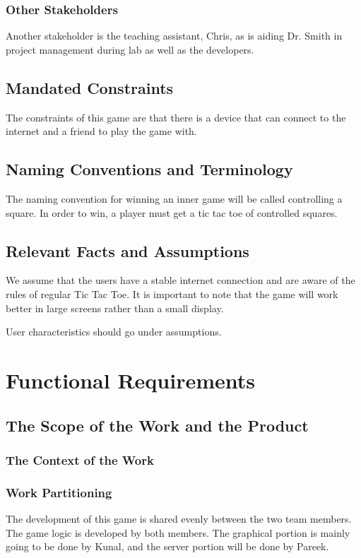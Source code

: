 \documentclass[12pt, titlepage]{article}
\begin{document}
\subsubsection{Other Stakeholders}
Another stakeholder is the teaching assistant, Chris, as is aiding Dr. Smith in project management during lab as well as the developers.
\subsection{Mandated Constraints}
The constraints of this game are that there is a device that can connect to the internet and a friend to play the game with.
\subsection{Naming Conventions and Terminology}
The naming convention for winning an inner game will be called controlling a square. In order to win, a player must get a tic tac toe of controlled squares.
\subsection{Relevant Facts and Assumptions}
We assume that the users have a stable internet connection and are aware of the rules of regular Tic Tac Toe. It is important to note that the game will work better in large screens rather than a small display. 

User characteristics should go under assumptions.

\section{Functional Requirements}

\subsection{The Scope of the Work and the Product}

\subsubsection{The Context of the Work}

\subsubsection{Work Partitioning}
The development of this game is shared evenly between the two team members. The game logic is developed by both members. The graphical portion is mainly going to be done by Kunal, and the server portion will be done by Pareek.
\end{document}
